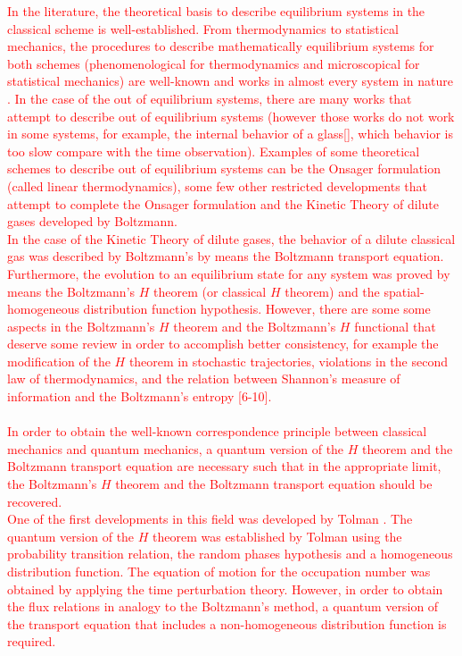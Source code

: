 \documentclass{article}
\begin{document}
\textcolor{red}{In the literature, the theoretical basis to describe equilibrium systems in the classical scheme is well-established. From thermodynamics to statistical mechanics, the procedures to describe mathematically equilibrium systems for both schemes (phenomenological for thermodynamics and microscopical for statistical mechanics) are well-known and works in almost every system in nature \cite{huang, reif, patrick}. In the case of the out of equilibrium systems, there are many works that attempt to describe out of equilibrium systems (however those works do not work in some systems, for example, the internal behavior of a glass[], which behavior is too slow compare with the time observation). Examples of some theoretical schemes to describe out of equilibrium systems can be the Onsager formulation (called linear thermodynamics), some few other restricted developments that attempt to complete the Onsager formulation \cite{kei, onsager} and the Kinetic Theory of dilute gases developed by Boltzmann.\\
In the case of the Kinetic Theory of dilute gases, the behavior of a dilute classical gas was described by Boltzmann's by means the Boltzmann transport equation. Furthermore, the evolution to an equilibrium state for any system was proved by means the Boltzmann's $H$ theorem (or classical $H$ theorem) and the spatial-homogeneous distribution function hypothesis.
However, there are some some aspects in the Boltzmann's $H$ theorem and the Boltzmann's $H$ functional that deserve some review in order to accomplish better consistency, for example the modification of the $H$ theorem in stochastic trajectories, violations in the second law of thermodynamics, and the relation between Shannon's measure of information and the Boltzmann's entropy  [6-10].\\ %
\\
In order to obtain the well-known correspondence principle between classical mechanics and quantum mechanics, a quantum version of the $H$ theorem and the Boltzmann transport equation are necessary such that in the appropriate limit, the  Boltzmann's $H$ theorem and the Boltzmann transport equation should be recovered.\\
One of the first developments in this field was developed by Tolman \cite{tolman}. The quantum version of the $H$ theorem was established by Tolman using the probability transition relation, the random phases hypothesis and a homogeneous distribution function. The equation of motion for the occupation number was obtained by applying the time perturbation theory. However, in order to obtain the flux relations in analogy to the Boltzmann's method, a quantum version of the transport equation that includes a non-homogeneous distribution function is required.\\
}
\end{document}

